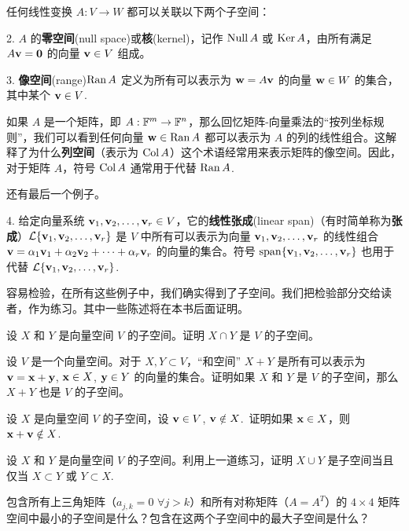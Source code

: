 任何线性变换 $A: V \to W$ 都可以关联以下两个子空间：

2. $A$ 的\textbf{零空间}(null space)或\textbf{核}(kernel)，记作 $\operatorname{Null} A$ 或 $\operatorname{Ker} A$，由所有满足 $A \mathbf{v} = \mathbf{0}$ 的向量 $\mathbf{v} \in V$ 组成。

3. \textbf{像空间}(range)$\operatorname{Ran} A$ 定义为所有可以表示为 $\mathbf{w} = A \mathbf{v}$ 的向量 $\mathbf{w} \in W$ 的集合，其中某个 $\mathbf{v} \in V$.

如果 $A$ 是一个矩阵，即 $A: \mathbb{F}^m \to \mathbb{F}^n$，那么回忆矩阵-向量乘法的“按列坐标规则”，我们可以看到任何向量 $\mathbf{w} \in \operatorname{Ran} A$ 都可以表示为 $A$ 的列的线性组合。这解释了为什么\textbf{列空间}（表示为 $\operatorname{Col} A$）这个术语经常用来表示矩阵的像空间。因此，对于矩阵 $A$，符号 $\operatorname{Col} A$ 通常用于代替 $\operatorname{Ran} A$.

还有最后一个例子。

4. 给定向量系统 $\mathbf{v}_1, \mathbf{v}_2, \dots, \mathbf{v}_r \in V$，它的\textbf{线性张成}(linear span)（有时简单称为\textbf{张成}）$\mathcal{L}\{\mathbf{v}_1, \mathbf{v}_2, \dots, \mathbf{v}_r\}$ 是 $V$ 中所有可以表示为向量 $\mathbf{v}_1, \mathbf{v}_2, \dots, \mathbf{v}_r$ 的线性组合 $\mathbf{v} = \alpha_1 \mathbf{v}_1 + \alpha_2 \mathbf{v}_2 + \dots + \alpha_r \mathbf{v}_r$ 的向量的集合。符号 $\operatorname{span}\{\mathbf{v}_1, \mathbf{v}_2, \dots, \mathbf{v}_r\}$ 也用于代替 $\mathcal{L}\{\mathbf{v}_1, \mathbf{v}_2, \dots, \mathbf{v}_r\}$.

容易检验，在所有这些例子中，我们确实得到了子空间。我们把检验部分交给读者，作为练习。其中一些陈述将在本书后面证明。


\begin{problemset}
\item \label{ex:01-07-01} 设 $X$ 和 $Y$ 是向量空间 $V$ 的子空间。证明 $X \cap Y$ 是 $V$ 的子空间。
\item \label{ex:01-07-02} 设 $V$ 是一个向量空间。对于 $X, Y \subset V$，“和空间” $X+Y$ 是所有可以表示为 $\mathbf{v} = \mathbf{x} + \mathbf{y}$, $\mathbf{x} \in X$, $\mathbf{y} \in Y$ 的向量的集合。证明如果 $X$ 和 $Y$ 是 $V$ 的子空间，那么 $X+Y$ 也是 $V$ 的子空间。
\item \label{ex:01-07-03} 设 $X$ 是向量空间 $V$ 的子空间，设 $\mathbf{v} \in V$, $\mathbf{v} \notin X$.~证明如果 $\mathbf{x} \in X$，则 $\mathbf{x} + \mathbf{v} \notin X$.~
\item \label{ex:01-07-04} 设 $X$ 和 $Y$ 是向量空间 $V$ 的子空间。利用上一道练习，证明 $X \cup Y$ 是子空间当且仅当 $X \subset Y$ 或 $Y \subset X$.~
\item \label{ex:01-07-05} 包含所有上三角矩阵（$a_{j,k} = 0$ $\forall j > k$）和所有对称矩阵（$A = A^T$）的 $4 \times 4$ 矩阵空间中最小的子空间是什么？包含在这两个子空间中的最大子空间是什么？
\end{problemset}


